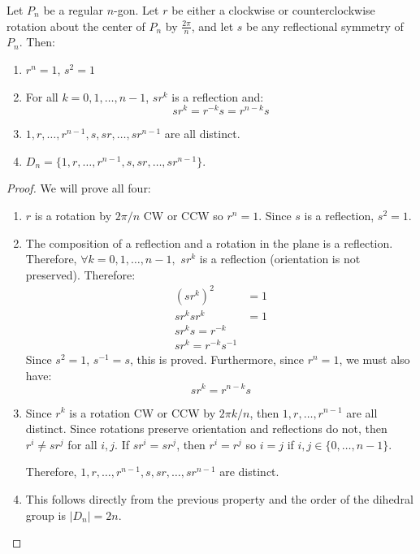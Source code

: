 \begin{itemize}
\begin{center}
    \end{center}
    \begin{lemma}
        Let $P_n$ be a regular $n$-gon. Let $r$ be either a clockwise or counterclockwise rotation about the center of $P_n$ by $\frac{2\pi}{n}$, and let $s$ be any reflectional symmetry of $P_n$. Then:
        \begin{enumerate}
            \item $r^n=1$, $s^2=1$
            \item For all $k=0,1,\dots,n-1$, $sr^k$ is a reflection and:
            \begin{equation}
                sr^k = r^{-k}s=r^{n-k}s
            \end{equation}
            \item $1,r,\dots,r^{n-1},s,sr,\dots,sr^{n-1}$ are all distinct.
            \item $D_n = \{1,r,\dots,r^{n-1},s,sr,\dots,sr^{n-1}\}$.
        \end{enumerate}
    \end{lemma}
    \begin{proof}
        We will prove all four:
        \begin{enumerate}
            \item $r$ is a rotation by $2\pi/n$ CW or CCW so $r^n=1$. Since $s$ is a reflection, $s^2=1$.
            \item The composition of a reflection and a rotation in the plane is a reflection. Therefore, $\forall k = 0,1,\dots,n-1,$ $sr^k$ is a reflection (orientation is not preserved). Therefore:
            \begin{align}
                (sr^k)^2 &= 1 \\ 
                sr^ksr^k &= 1 \\ 
                sr^ks = r^{-k} \\ 
                sr^k = r^{-k}s^{-1}
            \end{align}
            Since $s^2=1$, $s^{-1}=s$, this is proved. Furthermore, since $r^n=1$, we must also have:
            \begin{equation}
                sr^k = r^{n-k}s
            \end{equation}
            \item Since $r^k$ is a rotation CW or CCW by $2\pi k/n$, then $1,r,\dots,r^{n-1}$ are all distinct. Since rotations preserve orientation and reflections do not, then $r^i \neq sr^{j}$ for all $i,j$. If $sr^i = sr^j$, then $r^i=r^j$ so $i=j$ if $i,j \in \{0,\dots,n-1\}$.
            \vspace{2mm}

            Therefore, $1,r,\dots,r^{n-1},s,sr,\dots,sr^{n-1}$ are distinct.
            \item This follows directly from the previous property and the order of the dihedral group is $|D_n|=2n$.
        \end{enumerate}
    \end{proof}
\end{itemize}